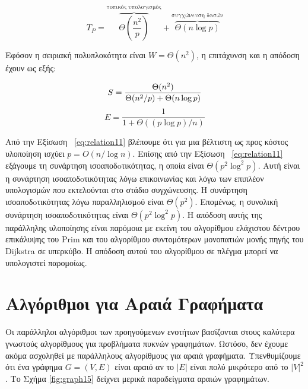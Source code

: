 \documentclass[12pt,a4paper]{article}
\begin{document}
\[
T_P = \overbrace{\Theta\left(\frac{n^2}{p}\right)}^{\text{τοπικός υπολογισμός}}
    + \overbrace{\Theta(n \log p)}^{\text{συγχώνευση δασών}}
\]
\par\vspace{0.3cm}
\noindent
Εφόσον η σειριακή πολυπλοκότητα είναι $W = \Theta(n^2)$, η επιτάχυνση 
και η απόδοση έχουν ως εξής:

\[
S = \frac{\Theta(n^2)}{\Theta(n^2/p) + \Theta(n \log p)} \\[6pt]
\]
\begin{equation}
E = \frac{1}{1 + \Theta((p \log p)/n)}
\label{eq:relation11}
\end{equation}
\par\vspace{0.3cm}
\noindent
Από την Εξίσωση ~\ref{eq:relation11} βλέπουμε ότι για μια βέλτιστη ως προς κόστος
υλοποίηση ισχύει $p = O(n / \log n)$. Επίσης από την Εξίσωση ~\ref{eq:relation11}
εξάγουμε τη συνάρτηση ισοαποδoτικότητας, η οποία είναι
$\Theta(p^2 \log^2 p)$. Αυτή είναι η συνάρτηση ισοαποδoτικότητας
λόγω επικοινωνίας και λόγω των επιπλέον υπολογισμών που εκτελούνται
στο στάδιο συγχώνευσης. Η συνάρτηση ισοαποδoτικότητας λόγω
παραλληλισμoύ είναι $\Theta(p^2)$. Επομένως, η συνολική συνάρτηση
ισοαποδoτικότητας είναι $\Theta(p^2 \log^2 p)$. Η απόδοση αυτής
της παράλληλης υλοποίησης είναι παρόμοια με εκείνη του αλγορίθμου
ελάχιστου δέντρου επικάλυψης του \foreignlanguage{english}{Prim} και του αλγορίθμου
συντομότερων μονοπατιών μονής πηγής του \foreignlanguage{english}{Dijkstra} σε υπερκύβο.
Η απόδοση αυτού του αλγορίθμου σε πλέγμα μπορεί να υπολογιστεί
παρομοίως.

\section{Αλγόριθμοι για Αραιά Γραφήματα}

Οι παράλληλοι αλγόριθμοι των προηγούμενων ενοτήτων βασίζονται στους
καλύτερα γνωστούς αλγορίθμους για προβλήματα πυκνών γραφημάτων. Ωστόσο,
δεν έχουμε ακόμα ασχοληθεί με παράλληλους αλγορίθμους για αραιά
γραφήματα. Υπενθυμίζουμε ότι ένα γράφημα $G = (V, E)$ είναι αραιό αν
το $|E|$ είναι πολύ μικρότερο από το $|V|^2$. Το Σχήμα \ref{fig:graph15} δείχνει
μερικά παραδείγματα αραιών γραφημάτων.
\end{document}
